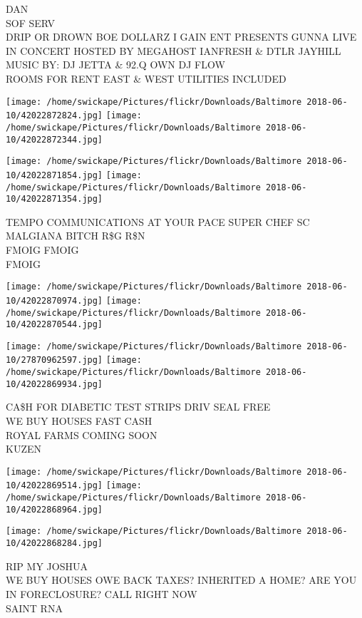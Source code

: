 \documentclass[10pt,letterpaper]{article}
\begin{document}
DAN\\
SOF SERV\\
DRIP OR DROWN BOE DOLLARZ I GAIN ENT PRESENTS GUNNA LIVE IN CONCERT HOSTED BY MEGAHOST IANFRESH \& DTLR JAYHILL MUSIC BY: DJ JETTA \& 92.Q OWN DJ FLOW\\
ROOMS FOR RENT EAST \& WEST UTILITIES INCLUDED
\pagebreak

\texttt{[image: /home/swickape/Pictures/flickr/Downloads/Baltimore 2018-06-10/42022872824.jpg]}
\texttt{[image: /home/swickape/Pictures/flickr/Downloads/Baltimore 2018-06-10/42022872344.jpg]}

\texttt{[image: /home/swickape/Pictures/flickr/Downloads/Baltimore 2018-06-10/42022871854.jpg]}
\texttt{[image: /home/swickape/Pictures/flickr/Downloads/Baltimore 2018-06-10/42022871354.jpg]}

TEMPO COMMUNICATIONS AT YOUR PACE SUPER CHEF SC\\
MALGIANA BITCH R\$G R\$N\\
FMOIG FMOIG\\
FMOIG
\pagebreak

\texttt{[image: /home/swickape/Pictures/flickr/Downloads/Baltimore 2018-06-10/42022870974.jpg]}
\texttt{[image: /home/swickape/Pictures/flickr/Downloads/Baltimore 2018-06-10/42022870544.jpg]}

\texttt{[image: /home/swickape/Pictures/flickr/Downloads/Baltimore 2018-06-10/27870962597.jpg]}
\texttt{[image: /home/swickape/Pictures/flickr/Downloads/Baltimore 2018-06-10/42022869934.jpg]}

CA\$H FOR DIABETIC TEST STRIPS DRIV SEAL FREE\\
WE BUY HOUSES FAST CASH\\
ROYAL FARMS COMING SOON\\
KUZEN
\pagebreak

\texttt{[image: /home/swickape/Pictures/flickr/Downloads/Baltimore 2018-06-10/42022869514.jpg]}
\texttt{[image: /home/swickape/Pictures/flickr/Downloads/Baltimore 2018-06-10/42022868964.jpg]}

\texttt{[image: /home/swickape/Pictures/flickr/Downloads/Baltimore 2018-06-10/42022868284.jpg]}

RIP MY JOSHUA\\
WE BUY HOUSES OWE BACK TAXES?  INHERITED A HOME?  ARE YOU IN FORECLOSURE?  CALL RIGHT NOW\\
SAINT RNA
\pagebreak
\end{document}
